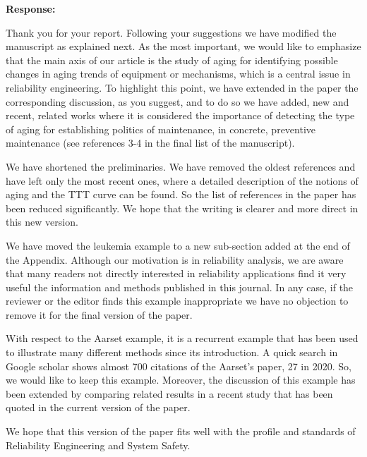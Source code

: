 \documentclass[12pt]{article}
\begin{document}
{\bf Response:} 

Thank you for your report. Following your suggestions we have modified the manuscript as explained next.
As the most important, we would like to emphasize that the main axis of our article is the study of aging for identifying possible changes in aging trends of equipment or mechanisms,  which is a central issue in reliability engineering. To highlight this point, we have extended in the paper the corresponding discussion, as you suggest, and to do so we have added, new and recent, related works where it is considered the importance of detecting the type of aging for establishing politics of maintenance, in concrete, preventive maintenance (see references 3-4 in the final list of the manuscript). \ 

We have shortened the preliminaries. We have removed the oldest references and have left only the most recent ones, where a detailed description of the notions of aging and the TTT curve can be found. So the list of references in the paper has been reduced significantly. We hope that the writing is clearer and more direct in this new version. \

We have moved the leukemia example to a new sub-section added at the end of the Appendix. Although our motivation is in reliability analysis, we are aware that many readers not directly interested in reliability applications find it very useful the information and methods published in this journal. In any case, if the reviewer or the editor finds this example inappropriate we have no objection to remove it for the final version of the paper.

With respect to the Aarset example, it is a recurrent example that has been used to illustrate many different methods since its introduction. A quick search in Google scholar shows almost 700 citations of the Aarset's paper, 27 in 2020. So, we would like to keep this example. Moreover, the discussion of this example has been extended by comparing related results in a recent study that has been quoted in the current version of the paper. 



We hope that this version of the paper fits well with the profile and standards of Reliability Engineering and System Safety. 
\end{document}
